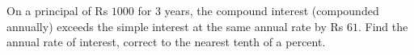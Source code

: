 On a principal of Rs $1000$ for $3$ years, the compound interest (compounded annually) exceeds the simple interest at the same annual rate by Rs $61$. Find the annual rate of interest, correct to the nearest tenth of a percent.
